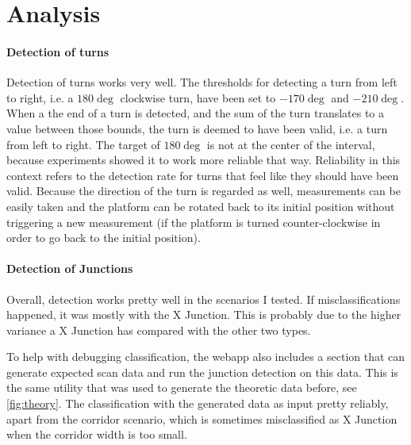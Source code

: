 \section{Analysis}
\label{sec:analysis}

\paragraph{Detection of turns}
Detection of turns works very well. The thresholds for detecting a turn from left to right, i.e. a $180\deg$ clockwise turn, have been set to $-170\deg$ and $-210\deg$.
When a the end of a turn is detected, and the sum of the turn translates to a value between those bounds, the turn is deemed to have been valid, i.e. a turn from left to right.
The target of $180\deg$ is not at the center of the interval, because experiments showed it to work more reliable that way.
Reliability in this context refers to the detection rate for turns that feel like they should have been valid.
Because the direction of the turn is regarded as well, measurements can be easily taken and the platform can be rotated back to its initial position without triggering a new measurement (if the platform is turned counter-clockwise in order to go back to the initial position).


\paragraph{Detection of Junctions}
Overall, detection works pretty well in the scenarios I tested.
If misclassifications happened, it was mostly with the X Junction.
This is probably due to the higher variance a X Junction has compared with the other two types.

To help with debugging classification, the webapp also includes a section that can generate expected scan data and run the junction detection on this data. This is the same utility that was used to generate the theoretic data before, see \ref{fig:theory}.
The classification with the generated data as input pretty reliably, apart from the corridor scenario, which is sometimes misclassified as X Junction when the corridor width is too small.